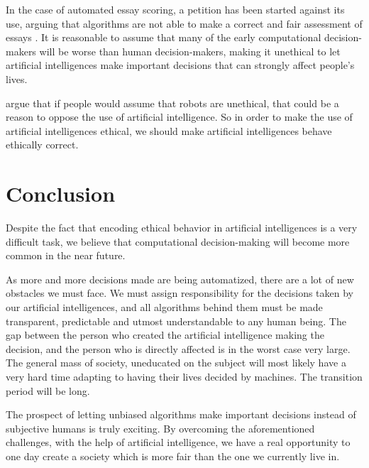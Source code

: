\documentclass[11pt]{article}
\begin{document}
In the case of automated essay scoring, a petition has been started against its use, arguing that 
algorithms are not able to make a correct and fair assessment of essays \cite{HumanReaders}. It is 
reasonable to assume that many of the early computational decision-makers will be worse than human
decision-makers, making it unethical to let artificial intelligences make important decisions that 
can strongly affect people's lives.

\citeauthor{anderson2010robot} argue that if people would assume that robots are unethical, that could
be a reason to oppose the use of artificial intelligence. So in order to make the use of artificial 
intelligences ethical, we should make artificial intelligences behave ethically correct.

\section{Conclusion}

Despite the fact that encoding ethical behavior in artificial intelligences is a very difficult task, we believe that computational decision-making will become more common in the near future. 

As more and more decisions made are being automatized, there are a lot of new obstacles we must face. We must assign responsibility for the decisions taken by our artificial intelligences, and all algorithms behind them must be made transparent, predictable and utmost understandable to any human being. The gap between the person who created the artificial intelligence making the decision, and the person who is directly affected is in the worst case very large. The general mass of society, uneducated on the subject will most likely have a very hard time adapting to having their lives decided by machines. The transition period will be long.

The prospect of letting unbiased algorithms make important decisions instead of subjective humans is truly exciting. By overcoming the aforementioned challenges, with the help of artificial intelligence, we have a real opportunity to one day create a society which is more fair than the one we currently live in.

\newpage


\end{document}
